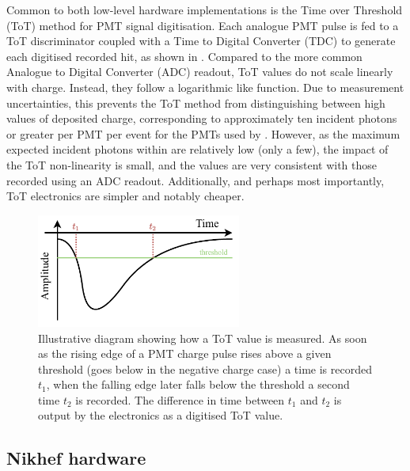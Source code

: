 Common to both low-level hardware implementations is the Time over Threshold (ToT) method for PMT
signal digitisation. Each analogue PMT pulse is fed to a ToT discriminator coupled with a Time to
Digital Converter (TDC) to generate each digitised recorded hit, as shown in .
Compared to the more common Analogue to Digital Converter (ADC) readout, ToT values do not scale
linearly with charge. Instead, they follow a logarithmic like function. Due to measurement
uncertainties, this prevents the ToT method from distinguishing between high values of deposited
charge, corresponding to approximately ten incident photons or greater per PMT per event for the
PMTs used by \chipsfive. However, as the maximum expected incident photons within \chipsfive are
relatively low (only a few), the impact of the ToT non-linearity is small, and the values are very
consistent with those recorded using an ADC readout. Additionally, and perhaps most importantly,
ToT electronics are simpler and notably cheaper.

\begin{figure} %
    \includegraphics[width=0.6\textwidth]{diagrams/5-daq/tot.pdf}
    \caption[Illustrative diagram showing how Time over Threshold is measured]
    {Illustrative diagram showing how a ToT value is measured. As soon as the rising edge of a PMT
        charge pulse rises above a given threshold (goes below in the negative charge case) a time
        is recorded $t_{1}$, when the falling edge later falls below the threshold a second time
        $t_{2}$ is recorded. The difference in time between $t_{1}$ and $t_{2}$ is output by the
        electronics as a digitised ToT value.}
    \label{fig:tot}
\end{figure}

\subsection{Nikhef hardware} %
\label{sec:daq_hard_Nikhed} %

